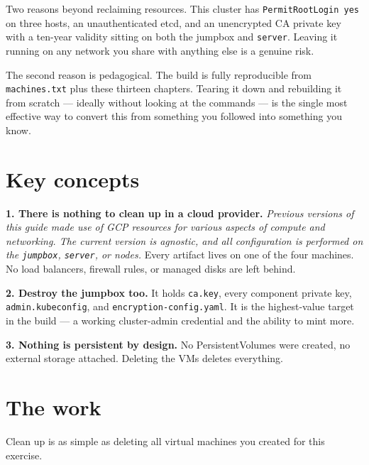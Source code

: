 \documentclass[11pt,oneside]{report}
\begin{document}
\begin{whybox}

Two reasons beyond
reclaiming
resources. This
cluster has
\texttt{PermitRootLogin\ yes}
on three hosts, an
unauthenticated
etcd, and an
unencrypted CA
private key with a
ten-year validity
sitting on both the
jumpbox and
\texttt{server}.
Leaving it running
on any network you
share with anything
else is a genuine
risk.

\end{whybox}

The second reason is
pedagogical. The
build is fully
reproducible from
\texttt{machines.txt}
plus these thirteen
chapters. Tearing it
down and rebuilding
it from scratch ---
ideally without
looking at the
commands --- is the
single most
effective way to
convert this from
something you
followed into
something you know.

\hypertarget{key-concepts-13}{%
\section{Key
concepts}\label{key-concepts-13}}

\textbf{1. There is
nothing to clean up
in a cloud
provider.}
\emph{Previous
versions of this
guide made use of
GCP resources for
various aspects of
compute and
networking. The
current version is
agnostic, and all
configuration is
performed on the
\texttt{jumpbox},
\texttt{server}, or
nodes.} Every
artifact lives on
one of the four
machines. No load
balancers, firewall
rules, or managed
disks are left
behind.

\textbf{2. Destroy
the jumpbox too.} It
holds
\texttt{ca.key},
every component
private key,
\texttt{admin.}\allowbreak{}\texttt{kubeconfig},
and
\texttt{encryption-}\allowbreak{}\texttt{config.}\allowbreak{}\texttt{yaml}.
It is the
highest-value target
in the build --- a
working
cluster-admin
credential and the
ability to mint
more.

\textbf{3. Nothing
is persistent by
design.} No
PersistentVolumes
were created, no
external storage
attached. Deleting
the VMs deletes
everything.

\hypertarget{the-work-12}{%
\section{The
work}\label{the-work-12}}

Clean up is as
simple as deleting
all virtual machines
you created for this
exercise.
\end{document}
